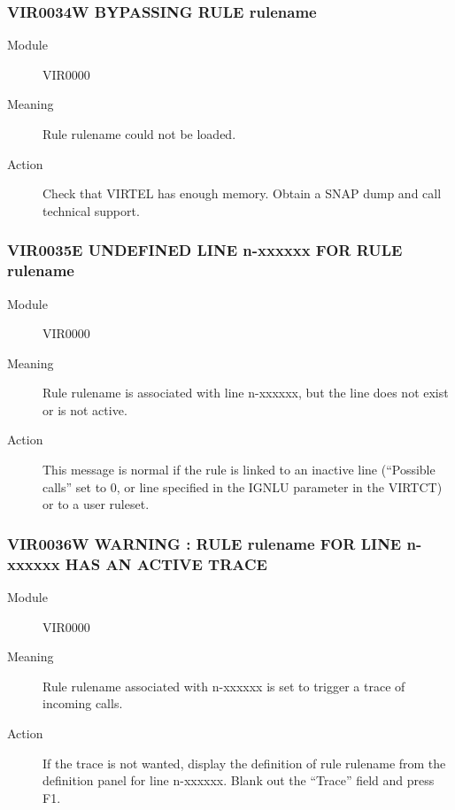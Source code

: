 \documentclass[letterpaper,10pt,english]{sphinxmanual}
\begin{document}
\subsubsection{VIR0034W BYPASSING RULE rulename}
\label{\detokenize{messages:vir0034w-bypassing-rule-rulename}}\begin{description}
\item[{Module}] \leavevmode
VIR0000

\item[{Meaning}] \leavevmode
Rule rulename could not be loaded.

\item[{Action}] \leavevmode
Check that VIRTEL has enough memory. Obtain a SNAP dump and call technical support.

\end{description}


\subsubsection{VIR0035E UNDEFINED LINE n-xxxxxx FOR RULE rulename}
\label{\detokenize{messages:vir0035e-undefined-line-n-xxxxxx-for-rule-rulename}}\begin{description}
\item[{Module}] \leavevmode
VIR0000

\item[{Meaning}] \leavevmode
Rule rulename is associated with line n-xxxxxx, but the line does not exist or is not active.

\item[{Action}] \leavevmode
This message is normal if the rule is linked to an inactive line (“Possible calls” set to 0, or line specified in the IGNLU parameter in the VIRTCT) or to a user ruleset.

\end{description}


\subsubsection{VIR0036W WARNING : RULE rulename FOR LINE n-xxxxxx HAS AN ACTIVE TRACE}
\label{\detokenize{messages:vir0036w-warning-rule-rulename-for-line-n-xxxxxx-has-an-active-trace}}\begin{description}
\item[{Module}] \leavevmode
VIR0000

\item[{Meaning}] \leavevmode
Rule rulename associated with n-xxxxxx is set to trigger a trace of incoming calls.

\item[{Action}] \leavevmode
If the trace is not wanted, display the definition of rule rulename from the definition panel for line n-xxxxxx. Blank out the “Trace” field and press F1.

\end{description}
\end{document}
